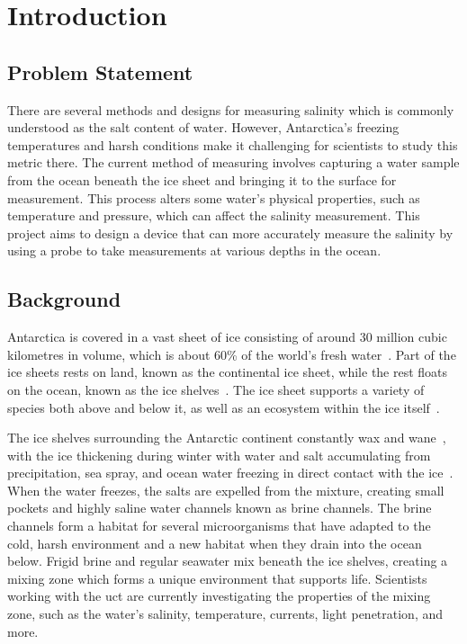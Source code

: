 
\chapter{Introduction}\label{ch:introduction}

\section{Problem Statement}

There are several methods and designs for measuring salinity which is commonly understood as the salt content of water.
However, Antarctica's freezing temperatures and harsh conditions make it challenging for scientists to study this metric there.
The current method of measuring involves capturing a water sample from the ocean beneath the ice sheet and bringing it to the surface for measurement.
This process alters some water's physical properties, such as temperature and pressure, which can affect the salinity measurement.
This project aims to design a device that can more accurately measure the salinity by using a probe to take measurements at various depths in the ocean.

\section{Background}

Antarctica is covered in a vast sheet of ice consisting of around 30 million cubic kilometres in volume, which is about 60\% of the world's fresh water~\cite{NSIDC_ice_sheet_facts_2024}.
Part of the ice sheets rests on land, known as the continental ice sheet, while the rest floats on the ocean, known as the ice shelves~\cite{nsidc_ice_shelves_2024}.
The ice sheet supports a variety of species both above and below it, as well as an ecosystem within the ice itself~\cite{noaa_arctic_expedition_2002}.

The ice shelves surrounding the Antarctic continent constantly wax and wane~\cite{nasa_antarctic_sea_ice_2021}, with the ice thickening during winter with water and salt accumulating from precipitation, sea spray, and ocean water freezing in direct contact with the ice~\cite{hogg_extending_record_ice_shelf_thickness_2021}.
When the water freezes, the salts are expelled from the mixture,  creating small pockets and highly saline water channels known as brine channels.
The brine channels form a habitat for several microorganisms that have adapted to the cold, harsh environment and a new habitat when they drain into the ocean below.
Frigid brine and regular seawater mix beneath the ice shelves, creating a mixing zone which forms a unique environment that supports life.
Scientists working with the \gls{uct} are currently investigating the properties of the mixing zone, such as the water's salinity, temperature, currents, light penetration, and more.

